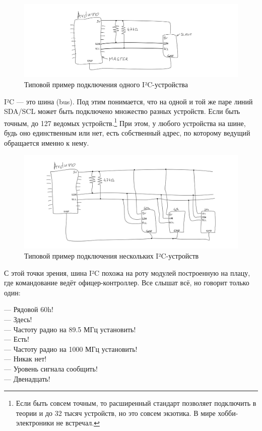 \begin{figure}
\centering
\includegraphics{sketches/i2c-single}
\caption{Типовой пример подключения одного I²C-устройства}
\end{figure}

I²C — это шина (bus). Под этим понимается, что на одной и той же паре линий SDA/SCL может быть подключено множество разных устройств. Если быть точным, до 127 ведомых устройств.\footnote{Если быть совсем точным, то расширенный стандарт позволяет подключить в теории и до 32 тысяч устройств, но это совсем экзотика. В мире хобби-электроники не встречал.} При этом, у любого устройства на шине, будь оно единственным или нет, есть собственный адрес, по которому ведущий обращается именно к нему.

\begin{figure}
\centering
\includegraphics{sketches/i2c-multiple}
\caption{Типовой пример подключения нескольких I²C-устройств}
\end{figure}

С этой точки зрения, шина I²C похожа на роту модулей построенную на плацу, где командование ведёт офицер-контроллер. Все слышат всё, но говорит только один:

— Рядовой 60h!\\
— Здесь!\\
— Частоту радио на 89.5 МГц установить!\\
— Есть!\\
— Частоту радио на 1000 МГц установить!\\
— Никак нет!\\
— Уровень сигнала сообщить!\\
— Двенадцать!

